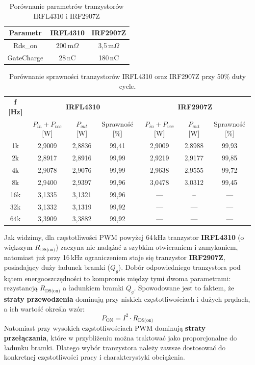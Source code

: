 \documentclass[11pt]{article}
\begin{document}
\begin{table}[H]
\centering
\begin{tabular}{|c|c|c|}
\hline
\textbf{Parametr} & \textbf{IRFL4310} & \textbf{IRF2907Z} \\
\hline
Rds\_on & 200\,m\(\Omega\) & 3,5\,m\(\Omega\) \\
\hline
GateCharge & 28\,nC & 180\,nC \\
\hline
\end{tabular}

\caption{Porównanie parametrów tranzystorów IRFL4310 i IRF2907Z}
\end{table}

\begin{table}[H]
\centering
\begin{tabular}{|c|c|c|c|c|c|c|}
\hline
\textbf{f [Hz]} & \multicolumn{3}{c|}{\textbf{IRFL4310}} & \multicolumn{3}{c|}{\textbf{IRF2907Z}} \\
\cline{2-7}
 & $P_{in}+P_{vcc}$ [W] & $P_{out}$ [W] & Sprawność [\%] & $P_{in}+P_{vcc}$ [W] & $P_{out}$ [W] & Sprawność [\%] \\
\hline
1k   & 2,9009 & 2,8836 & 99,41 & 2,9009 & 2,8988 & 99,93 \\
\hline
2k   & 2,8917 & 2,8916 & 99,99 & 2,9219 & 2,9177 & 99,85 \\
\hline
4k   & 2,9078 & 2,9076 & 99,99 & 2,9638 & 2,9555 & 99,72 \\
\hline
8k   & 2,9400 & 2,9397 & 99,96 & 3,0478 & 3,0312 & 99,45 \\
\hline
16k  & 3,1335 & 3,1321 & 99,96 & --- & -- & --- \\
\hline
32k  & 3,1332 & 3,1319 & 99,92 & --- & --- & --- \\
\hline
64k  & 3,3909 & 3,3882 & 99,92 & --- & --- & --- \\
\hline
\end{tabular}
\caption{Porównanie sprawności tranzystorów IRFL4310 oraz IRF2907Z przy 50\% duty cycle.}
\end{table}

Jak widzimy, dla częstotliwości PWM powyżej 64\,kHz tranzystor \textbf{IRFL4310} (o większym $R_{\text{DS(on)}}$) zaczyna nie nadążać z szybkim otwieraniem i zamykaniem, natomiast już przy 16\,kHz ograniczeniem staje się tranzystor \textbf{IRF2907Z}, posiadający duży ładunek bramki ($Q_g$).
Dobór odpowiedniego tranzystora pod kątem energooszczędności to kompromis między tymi dwoma parametrami: rezystancją $R_{\text{DS(on)}}$ a ładunkiem bramki $Q_g$.
Spowodowane jest to faktem, że \textbf{straty przewodzenia} dominują przy niskich częstotliwościach i dużych prądach, a ich wartość określa wzór:
\[
P_{\text{ON}} = I^2 \cdot R_{\text{DS(on)}}
\]
Natomiast przy wysokich częstotliwościach PWM dominują \textbf{straty przełączania}, które w przybliżeniu można traktować jako proporcjonalne do ładunku bramki.
Dlatego wybór tranzystora należy zawsze dostosować do konkretnej częstotliwości pracy i charakterystyki obciążenia.\\
\end{document}
